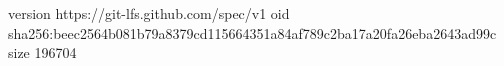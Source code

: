 version https://git-lfs.github.com/spec/v1
oid sha256:beec2564b081b79a8379cd115664351a84af789c2ba17a20fa26eba2643ad99c
size 196704
